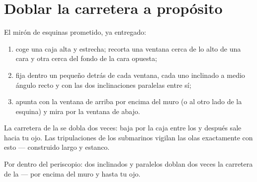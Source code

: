 \section{Doblar la carretera a propósito}

\begin{method}\label{met:g5:mirrors-reflection:periscope}
El mirón de esquinas prometido, ya entregado:
\begin{enumerate}
  \item coge una caja alta y estrecha; recorta una ventana cerca de
        lo alto de una cara y otra cerca del fondo de la cara
        opuesta;
  \item fija dentro un  pequeño detrás de cada ventana, cada
        uno inclinado a medio ángulo recto y con las dos
        inclinaciones paralelas entre sí;
  \item apunta con la ventana de arriba por encima del muro (o al
        otro lado de la esquina) y mira por la ventana de abajo.
\end{enumerate}
La carretera de la  se dobla dos veces: baja por la caja entre
los  y después sale hacia tu ojo. Las tripulaciones de los
submarinos vigilan las olas exactamente con esto --- construido largo
y estanco.
\end{method}

\begin{omfigure}

{\small Por dentro del periscopio: dos  inclinados y
paralelos doblan dos veces la carretera de la  --- por encima del
muro y hasta tu ojo.}
\end{omfigure}

